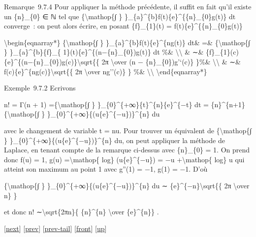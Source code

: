 \documentclass[]{article}
\begin{document}
Remarque~9.7.4 Pour appliquer la méthode précédente, il suffit en fait
qu'il existe un \{n\}\_\{0\} ∈ ℕ tel que \{\textbackslash{}mathop\{∫ \}
\}\_\{a\}\^{}\{b\}\textbar{}f(t)\textbar{}\{e\}\^{}\{\{n\}\_\{0\}g(t)\}
dt converge~: on peut alors écrire, en posant \{f\}\_\{1\}(t) =
f(t)\{e\}\^{}\{\{n\}\_\{0\}g(t)\}

\textbackslash{}begin\{eqnarray*\} \{\textbackslash{}mathop\{∫ \}
\}\_\{a\}\^{}\{b\}f(t)\{e\}\^{}\{ng(t)\} dt\& =\&
\{\textbackslash{}mathop\{∫ \} \}\_\{a\}\^{}\{b\}\{f\}\_\{
1\}(t)\{e\}\^{}\{(n−\{n\}\_\{0\})g(t)\} dt \%\&
\textbackslash{}\textbackslash{} \& ∼\&
\{f\}\_\{1\}(c)\{e\}\^{}\{(n−\{n\}\_\{0\})g(c)\}\textbackslash{}sqrt\{\{
2π \textbackslash{}over (n − \{n\}\_\{0\})\textbar{}g'`(c)\textbar{}\}
\}\%\& \textbackslash{}\textbackslash{} \& ∼\&
f(c)\{e\}\^{}\{ng(c)\}\textbackslash{}sqrt\{\{ 2π \textbackslash{}over
n\textbar{}g''(c)\textbar{}\} \} \%\& \textbackslash{}\textbackslash{}
\textbackslash{}end\{eqnarray*\}

Exemple~9.7.2 Ecrivons

n! = Γ(n + 1) =\{\textbackslash{}mathop\{∫ \}
\}\_\{0\}\^{}\{+∞\}\{t\}\^{}\{n\}\{e\}\^{}\{−t\} dt =
\{n\}\^{}\{n+1\}\{\textbackslash{}mathop\{∫ \}
\}\_\{0\}\^{}\{+∞\}\{(u\{e\}\^{}\{−u\})\}\^{}\{n\} du

avec le changement de variable t = nu. Pour trouver un équivalent de
\{\textbackslash{}mathop\{∫ \}
\}\_\{0\}\^{}\{+∞\}\{(u\{e\}\^{}\{−u\})\}\^{}\{n\} du, on peut appliquer
la méthode de Laplace, en tenant compte de la remarque ci-dessus avec
\{n\}\_\{0\} = 1. On prend donc f(u) = 1, g(u) =\textbackslash{}mathop\{
log\} (u\{e\}\^{}\{−u\}) = −u +\textbackslash{}mathop\{ log\} u qui
atteint son maximum au point 1 avec g''(1) = −1, g(1) = −1. D'où

\{\textbackslash{}mathop\{∫ \}
\}\_\{0\}\^{}\{+∞\}\{(u\{e\}\^{}\{−u\})\}\^{}\{n\} du ∼
\{e\}\^{}\{−n\}\textbackslash{}sqrt\{\{ 2π \textbackslash{}over n\} \}

et donc n! ∼\textbackslash{}sqrt\{2πn\}\{ \{n\}\^{}\{n\}
\textbackslash{}over \{e\}\^{}\{n\}\} .

{[}\href{coursse57.html}{next}{]} {[}\href{coursse55.html}{prev}{]}
{[}\href{coursse55.html\#tailcoursse55.html}{prev-tail}{]}
{[}\href{coursse56.html}{front}{]}
{[}\href{coursch10.html\#coursse56.html}{up}{]}
\end{document}

